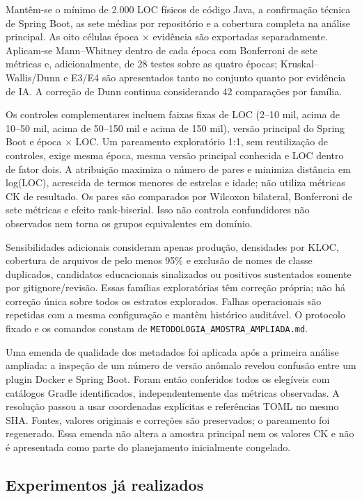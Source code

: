Mantêm-se o mínimo de 2.000 LOC físicos de código Java, a confirmação técnica de Spring Boot, as sete médias por repositório e a cobertura completa na análise principal. As oito células época $\times$ evidência são exportadas separadamente. Aplicam-se Mann--Whitney dentro de cada época com Bonferroni de sete métricas e, adicionalmente, de 28 testes sobre as quatro épocas; Kruskal--Wallis/Dunn e E3/E4 são apresentados tanto no conjunto quanto por evidência de IA. A correção de Dunn continua considerando 42 comparações por família.

Os controles complementares incluem faixas fixas de LOC (2--10 mil, acima de 10--50 mil, acima de 50--150 mil e acima de 150 mil), versão principal do Spring Boot e época $\times$ LOC. Um pareamento exploratório 1:1, sem reutilização de controles, exige mesma época, mesma versão principal conhecida e LOC dentro de fator dois. A atribuição maximiza o número de pares e minimiza distância em log(LOC), acrescida de termos menores de estrelas e idade; não utiliza métricas CK de resultado. Os pares são comparados por Wilcoxon bilateral, Bonferroni de sete métricas e efeito rank-biserial. Isso não controla confundidores não observados nem torna os grupos equivalentes em domínio.

Sensibilidades adicionais consideram apenas produção, densidades por KLOC, cobertura de arquivos de pelo menos 95\% e exclusão de nomes de classe duplicados, candidatos educacionais sinalizados ou positivos sustentados somente por gitignore/revisão. Essas famílias exploratórias têm correção própria; não há correção única sobre todos os estratos explorados. Falhas operacionais são repetidas com a mesma configuração e mantêm histórico auditável. O protocolo fixado e os comandos constam de \texttt{METODOLOGIA\_AMOSTRA\_AMPLIADA.md}.

Uma emenda de qualidade dos metadados foi aplicada após a primeira análise ampliada: a inspeção de um número de versão anômalo revelou confusão entre um plugin Docker e Spring Boot. Foram então conferidos todos os elegíveis com catálogos Gradle identificados, independentemente das métricas observadas. A resolução passou a usar coordenadas explícitas e referências TOML no mesmo SHA. Fontes, valores originais e correções são preservados; o pareamento foi regenerado. Essa emenda não altera a amostra principal nem os valores CK e não é apresentada como parte do planejamento inicialmente congelado.

\subsection{Experimentos já realizados}
\label{subsec:piloto}

